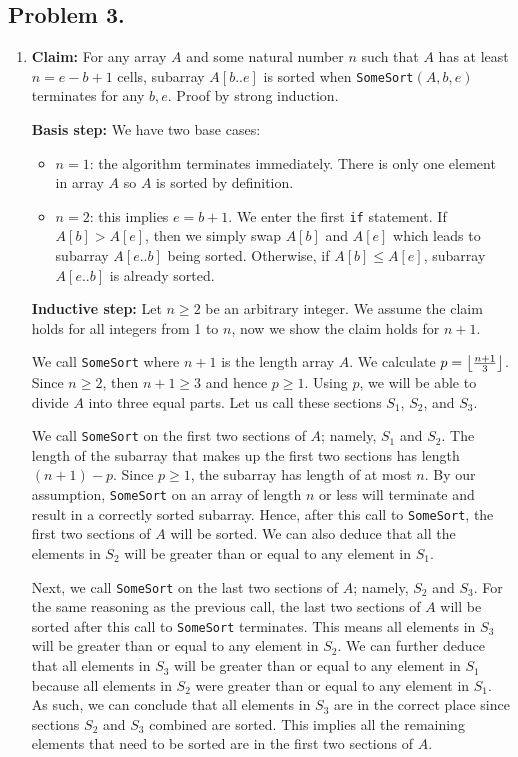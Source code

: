 \documentclass[11pt, letterpaper, titlepage]{article}
\DeclarePairedDelimiter\floor{\lfloor}{\rfloor}
\begin{document}
\subsection*{Problem 3.}
\begin{enumerate}[label=\alph*)]
    \item \textbf{Claim:} For any array $A$ and some natural number $n$ such that $A$ has at least $n = e - b + 1$ cells, subarray $A[b..e]$ is sorted when \texttt{SomeSort}$(A, b, e)$ terminates for any $b, e$. Proof by strong induction.
    
    \textbf{Basis step:} We have two base cases:
    \begin{itemize}
        \item $n = 1$: the algorithm terminates immediately. There is only one element in array $A$ so $A$ is sorted by definition.
        \item $n = 2$: this implies $e = b + 1$. We enter the first \texttt{if} statement. If $A[b] > A[e]$, then we simply swap $A[b]$ and $A[e]$ which leads to subarray $A[e..b]$ being sorted. Otherwise, if $A[b] \leq A[e]$, subarray $A[e..b]$ is already sorted.
    \end{itemize}
    
    \textbf{Inductive step:} Let $n \geq 2$ be an arbitrary integer. We assume the claim holds for all integers from 1 to $n$, now we show the claim holds for $n + 1$. 

    We call \texttt{SomeSort} where $n + 1$ is the length array $A$. We calculate $p= \floor*{\frac{n + 1}{3}}$. Since $n \geq 2$, then $n + 1 \geq 3$ and hence $p \geq 1$. Using $p$, we will be able to divide $A$ into three equal parts. Let us call these sections $S_1$, $S_2$, and $S_3$.
    
    We call \texttt{SomeSort} on the first two sections of $A$; namely, $S_1$ and $S_2$. The length of the subarray that makes up the first two sections has length $(n + 1) - p$. Since $p \geq 1$, the subarray has length of at most $n$. By our assumption, \texttt{SomeSort} on an array of length $n$ or less will terminate and result in a correctly sorted subarray. Hence, after this call to \texttt{SomeSort}, the first two sections of $A$ will be sorted. We can also deduce that all the elements in $S_2$ will be greater than or equal to any element in $S_1$.

    Next, we call \texttt{SomeSort} on the last two sections of $A$; namely, $S_2$ and $S_3$. For the same reasoning as the previous call, the last two sections of $A$ will be sorted after this call to \texttt{SomeSort} terminates. This means all elements in $S_3$ will be greater than or equal to any element in $S_2$. We can further deduce that all elements in $S_3$ will be greater than or equal to any element in $S_1$ because all elements in $S_2$ were greater than or equal to any element in $S_1$. As such, we can conclude that all elements in $S_3$ are in the correct place since sections $S_2$ and $S_3$ combined are sorted. This implies all the remaining elements that need to be sorted are in the first two sections of $A$.


\end{enumerate}
\end{document}
